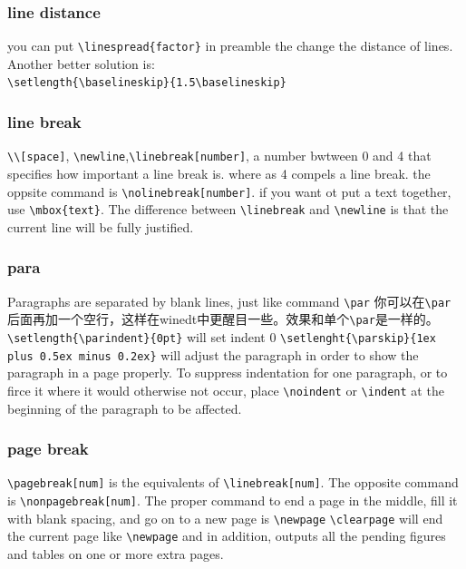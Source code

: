 \documentclass[a4paper,12pt,twoside]{book}
\begin{document}
		\subsubsection{line distance}
			you can put \verb=\linespread{factor}= in preamble the change the distance of lines. Another better solution is: \\
			\verb=\setlength{\baselineskip}{1.5\baselineskip}=
		\subsubsection{line break}
			\verb=\\[space]=, \verb=\newline=,\verb=\linebreak[number]=, a number bwtween 0 and 4 that specifies how important a line break is. where as 4 compels a line break. the oppsite command is \verb=\nolinebreak[number]=.  if you want ot put a text together, use \verb=\mbox{text}=.
			The difference between \verb=\linebreak= and \verb=\newline= is that the current line will be fully justified.
		\subsubsection{para}
			Paragraphs are separated by blank lines, just like command \verb=\par= 你可以在\verb=\par= 后面再加一个空行，这样在winedt中更醒目一些。效果和单个\verb=\par=是一样的。
			\verb=\setlength{\parindent}{0pt}= will set indent 0 \linebreak
			\verb=\setlenght{\parskip}{1ex plus 0.5ex minus 0.2ex}= will adjust the paragraph in order to show the paragraph in a page properly. To suppress indentation for one paragraph, or to firce it where it would otherwise not occur, place \verb=\noindent= or \verb=\indent= at the beginning of the paragraph to be affected.
		\subsubsection{page break}
			\verb=\pagebreak[num]= is the equivalents of \verb=\linebreak[num]=. The opposite command is \verb=\nonpagebreak[num]=. The proper command to end a page in the middle, fill it with blank spacing, and go on to a new page is \verb=\newpage=
			\verb=\clearpage= will end the current page like \verb=\newpage= and in addition, outputs all the pending figures and tables on one or more extra pages.
\end{document}
